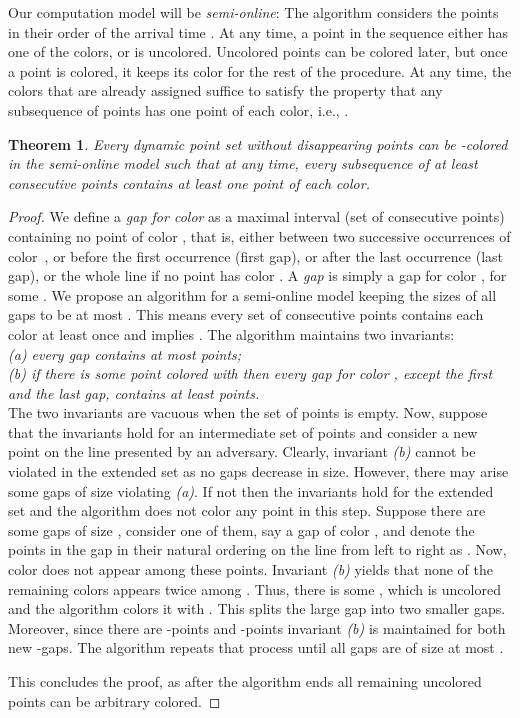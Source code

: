 \documentclass[11pt,a4paper]{amsart}
\theoremstyle{plain}
\newtheorem{theorem}{Theorem}[section]
\theoremstyle{definition}
\begin{document}
Our computation model will be {\em semi-online}: The algorithm considers the points in their order of the arrival time . At any time, a point in the sequence either has one of the  colors, or is uncolored. Uncolored points can be colored later, but once a point is colored, it keeps its color for the rest of the procedure. At any time, the colors that are already assigned suffice to satisfy the property that any subsequence of  points has one point of each color, i.e., . 

\begin{theorem}
\label{thm:main}
Every dynamic point set without disappearing points can be -colored in the semi-online model such that at any time, every subsequence of at least  consecutive points contains at least one point of each color.
\end{theorem}

\begin{proof}
We define a {\em gap for color}  as a maximal interval (set of consecutive points) containing no point of color , 
that is, either between two successive occurrences of color~, 
or before the first occurrence (first gap), 
or after the last occurrence (last gap),
or the whole line if no point has color . 
A {\em gap} is simply a gap for color , for some . 
We propose an algorithm for a semi-online model keeping the sizes of all gaps to be at most . 
This means every set of  consecutive points contains each color at least once and implies .
The algorithm maintains two invariants:\\

{\it (a) every gap contains at most  points;}\\

{\it (b) if there is some point colored with  then every gap for
  color , except the first and the last gap, contains at least  points.}\\



The two invariants are vacuous when the set of points is empty. 
Now, suppose that the invariants hold for an intermediate set of points and consider a new point on the line presented by an adversary. 
Clearly, invariant {\it (b)} cannot be violated in the extended set as no gaps decrease in size. 
However, there may arise some gaps of size  violating {\it (a)}. 
If not then the invariants hold for the extended set and the algorithm does not color any point in this step.
Suppose there are some gaps of size , consider one of them, say a gap of color , and denote the points in the gap in their natural ordering on the line from left to right as . 
Now, color  does not appear among these points. 
Invariant {\it (b)} yields that none of the  remaining colors appears twice among . 
Thus, there is some , which is uncolored and the algorithm colors it with . 
This splits the large gap into two smaller gaps. 
Moreover, since there are  -points and  -points invariant {\it (b)} is maintained for both new -gaps. 
The algorithm repeats that process until all gaps are of size at most .

This concludes the proof, as after the algorithm ends all remaining
uncolored points can be arbitrary colored.
\end{proof}
\end{document}
